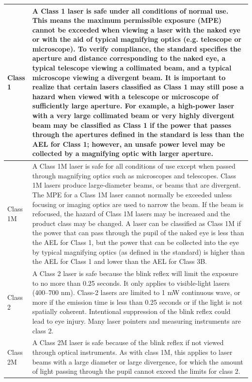 \begin{appendices}
\begin{en}
\begin{table}
\begin{bigcenter}
	\begin{tabular}{|l|p{}|}
\hline 
Class 1 & A Class 1 laser is safe under all conditions of normal use. This means the maximum permissible exposure (MPE) cannot be exceeded when viewing a laser with the naked eye or with the aid of typical magnifying optics (e.g. telescope or microscope). To verify compliance, the standard specifies the aperture and distance corresponding to the naked eye, a typical telescope viewing a collimated beam, and a typical microscope viewing a divergent beam. It is important to realize that certain lasers classified as Class 1 may still pose a hazard when viewed with a telescope or microscope of sufficiently large aperture. For example, a high-power laser with a very large collimated beam or very highly divergent beam may be classified as Class 1 if the power that passes through the apertures defined in the standard is less than the AEL for Class 1; however, an unsafe power level may be collected by a magnifying optic with larger aperture. \\
\hline
Class 1M & A Class 1M laser is safe for all conditions of use except when passed through magnifying optics such as microscopes and telescopes. Class 1M lasers produce large-diameter beams, or beams that are divergent. The MPE for a Class 1M laser cannot normally be exceeded unless focusing or imaging optics are used to narrow the beam. If the beam is refocused, the hazard of Class 1M lasers may be increased and the product class may be changed. A laser can be classified as Class 1M if the power that can pass through the pupil of the naked eye is less than the AEL for Class 1, but the power that can be collected into the eye by typical magnifying optics (as defined in the standard) is higher than the AEL for Class 1 and lower than the AEL for Class 3B. \\
\hline
Class 2 & A Class 2 laser is safe because the blink reflex will limit the exposure to no more than 0.25 seconds. It only applies to visible-light lasers (400–700 nm). Class-2 lasers are limited to 1 mW continuous wave, or more if the emission time is less than 0.25 seconds or if the light is not spatially coherent. Intentional suppression of the blink reflex could lead to eye injury. Many laser pointers and measuring instruments are class 2. \\
\hline
Class 2M & A Class 2M laser is safe because of the blink reflex if not viewed through optical instruments. As with class 1M, this applies to laser beams with a large diameter or large divergence, for which the amount of light passing through the pupil cannot exceed the limits for class 2. \\

\end{tabular}
\end{bigcenter}
\end{table}
\end{en}
\end{appendices}
